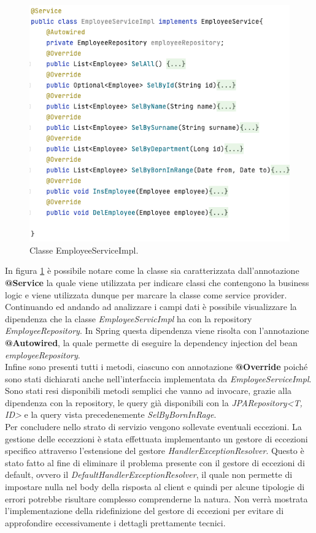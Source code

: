 \begin{figure}[!ht]
\begin{mdframed}
\centering
\includegraphics[width=1\linewidth]{immagini/employeeServiceImpl.png}
\end{mdframed}
\caption{Classe EmployeeServiceImpl.}
\label{employeeServiceImpl}
\end{figure}
\FloatBarrier
In figura \ref{employeeServiceImpl} è possibile notare come la classe sia caratterizzata dall'annotazione \textbf{@Service} la quale viene utilizzata per indicare classi che contengono la business logic e viene utilizzata dunque per marcare la classe come service provider.\\
Continuando ed andando ad analizzare i campi dati è possibile visualizzare la dipendenza che la classe \textit{EmployeeServicImpl} ha con la repository \textit{EmployeeRepository}. In Spring questa dipendenza viene risolta con l'annotazione \textbf{@Autowired}, la quale permette di eseguire la dependency injection del bean \textit{employeeRepository}.\\
Infine sono presenti tutti i metodi, ciascuno con annotazione \textbf{@Override} poiché sono stati dichiarati anche nell'interfaccia implementata da \textit{EmployeeServiceImpl}. Sono stati resi disponibili metodi semplici che vanno ad invocare, grazie alla dipendenza con la repository, le query già disponibili con la \textit{JPARepository<T, ID>} e la query vista precedenemente \textit{SelByBornInRage}.\\
Per concludere nello strato di servizio vengono sollevate eventuali eccezioni. La gestione delle eccezzioni è stata effettuata implementanto un gestore di eccezioni specifico attraverso l'estensione del gestore  \textit{HandlerExceptionResolver}. Questo è stato fatto al fine di eliminare il problema presente con il gestore di eccezioni di default, ovvero il \textit{DefaultHandlerExceptionResolver}, il quale non permette di impostare nulla nel body della risposta al client e quindi per alcune tipologie di errori potrebbe risultare complesso comprenderne la natura. Non verrà mostrata l'implementazione della ridefinizione del gestore di eccezioni per evitare di approfondire eccessivamente i dettagli prettamente tecnici.
